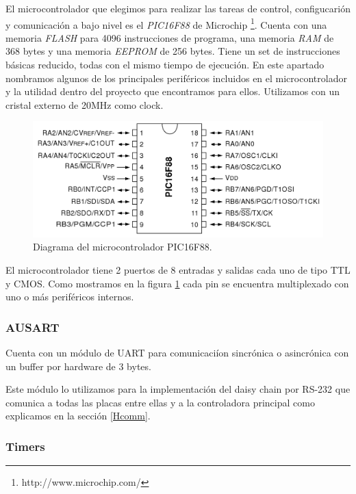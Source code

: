 El microcontrolador que elegimos para realizar las tareas de control, configucari\'on y comunicaci\'on a bajo nivel es el \emph{PIC16F88} de
Microchip \footnote{http://www.microchip.com/}. Cuenta con una memoria \emph{FLASH} para 4096 instrucciones de programa, una memoria
\emph{RAM} de 368 bytes y una memoria \emph{EEPROM} de 256 bytes. Tiene un set de instrucciones b\'asicas reducido, todas con el mismo
tiempo de ejecuci\'on. En este apartado nombramos algunos de los principales perif\'ericos incluidos en el microcontrolador y la utilidad
dentro del proyecto que encontramos para ellos. Utilizamos con un cristal externo de 20MHz como clock.

\begin{figure}[ht]
	\centering
	\includegraphics[scale=0.20]{pic16f88.png}
	\caption{Diagrama del microcontrolador PIC16F88.}
	\label{HFpic16f88}
\end{figure}

El microcontrolador tiene 2 puertos de 8 entradas y salidas cada uno de tipo TTL y CMOS.
Como mostramos en la figura \ref{HFpic16f88} cada pin se encuentra multiplexado con uno o m\'as perif\'ericos internos.

\subsubsection{AUSART}
\label{HMrs232}

Cuenta con un m\'odulo de UART para comunicaci\'ion sincr\'onica o asincr\'onica con un buffer por hardware de 3 bytes.

Este m\'odulo lo utilizamos para la implementaci\'on del daisy chain por RS-232 que comunica a todas las placas entre
ellas y a la controladora principal como explicamos en la secci\'on \ref{Hcomm}.

\subsubsection{Timers}
\label{timers}

